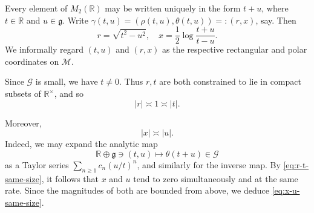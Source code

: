\documentclass[reqno,10pt]{amsart}
\theoremstyle{plain} %
\theoremstyle{definition}
\theoremstyle{plain} %
\theoremstyle{remark}
\theoremstyle{itplain} %
\theoremstyle{remark} %
\renewcommand{\geq}{\geqslant}
\numberwithin{equation}{section}
\begin{document}
Every element of $M_2(\mathbb{R})$ may be written uniquely in the form $t + u$, where $t \in \mathbb{R}$ and $u \in \mathfrak{g}$.  Write $\gamma(t,u) = (\rho(t,u), \theta(t,u)) =: (r,x)$, say.  Then
\[
  r = \sqrt{t^2 - u^2}, \quad x = \frac{1}{2} \log \frac{t + u }{t - u}.
\]
We informally regard $(t,u)$ and $(r,x)$ as the respective rectangular and polar coordinates on $\mathcal{M}$.


Since $\mathcal{G}$ is small, we have $t \neq 0$.  Thus $r,t$ are both constrained to lie in compact subsets of $\mathbb{R}^\times$, and so
\begin{equation}\label{eq:r-t-same-size}
  |r| \asymp 1 \asymp |t|.
\end{equation}

Moreover,
\begin{equation}\label{eq:x-u-same-size}
  |x| \asymp |u|.
\end{equation}
Indeed, we may expand the analytic map
\begin{equation}\label{eq:gamma-2-of-t-u}
  \mathbb{R} \oplus \mathfrak{g}
  \ni (t,u) \mapsto \theta(t+u) \in \mathcal{G}
\end{equation}
as a Taylor series $\sum_{n \geq 1} c_n (u/t)^n$, and similarly for the inverse map.  By \eqref{eq:r-t-same-size}, it follows that $x$ and $u$ tend to zero simultaneously and at the same rate.  Since the magnitudes of both are bounded from above, we deduce \eqref{eq:x-u-same-size}.
\end{document}
